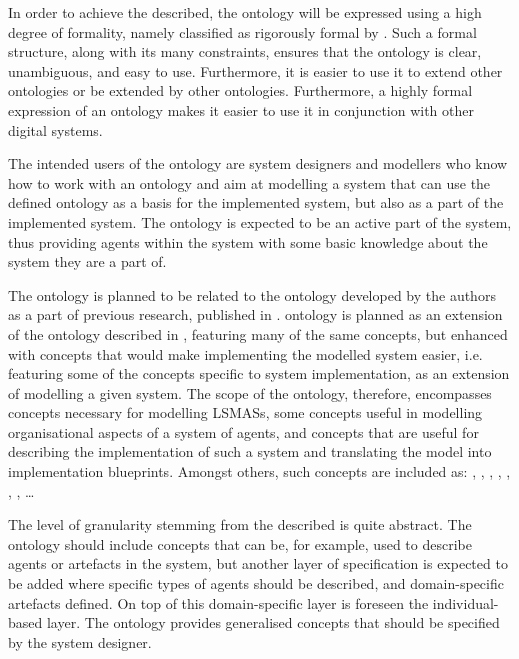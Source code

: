 In order to achieve the described, the \magoontologyname ontology will be expressed using a high degree of formality, namely classified as rigorously formal by \cite{uschold1996OntologiesPrinciplesMethods}.
%
Such a formal structure, along with its many constraints, ensures that the ontology is clear, unambiguous, and easy to use. Furthermore, it is easier to use it to extend other ontologies or be extended by other ontologies. Furthermore, a highly formal expression of an ontology makes it easier to use it in conjunction with other digital systems.

The intended users%
%
of the \magoontologyname ontology are system designers and modellers who know how to work with an ontology and aim at modelling a system that can use the defined ontology as a basis for the implemented system, but also as a part of the implemented system. The ontology is expected to be an active part of the system, thus providing agents within the system with some basic knowledge about the system they are a part of. 

The ontology is planned to be related to the ontology developed by the authors as a part of previous research, published in \cite{okresaduric2019MAMbO5NewOntology}. \magoontologyname ontology is planned as an extension of the ontology described in \cite{okresaduric2019MAMbO5NewOntology},
%
featuring many of the same concepts, but enhanced with concepts that would make implementing the modelled system easier, i.e. featuring some of the concepts specific to system implementation, as an extension of modelling a given system. The scope of the \magoontologyname ontology, therefore, encompasses concepts necessary for modelling \acp{LSMAS}, some concepts useful in modelling organisational aspects of a system of agents, and concepts that are useful for describing the implementation of such a system and translating the model into implementation blueprints. Amongst others, such concepts are included as: , , , , , , , \ldots

The level of granularity
%
stemming from the described is quite abstract. The ontology should include concepts that can be, for example, used to describe agents or artefacts in the system, but another layer of specification is expected to be added where specific types of agents should be described, and domain-specific artefacts defined. On top of this domain-specific layer is foreseen the individual-based layer. The \magoontologyname ontology provides generalised concepts that should be specified by the system designer. 
